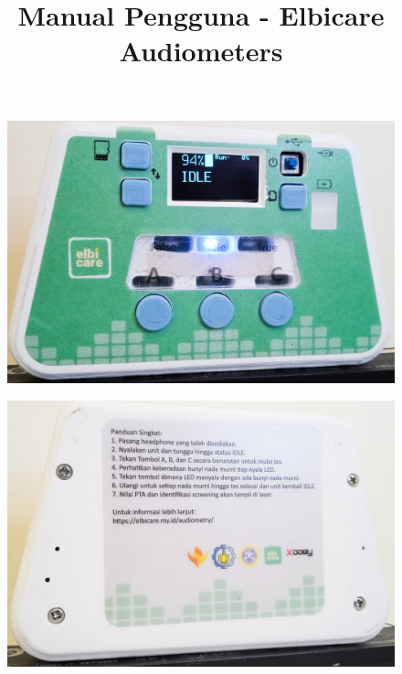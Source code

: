 \documentclass[11pt,a4paper,twoside,onecolumn]{book}
\title{Manual Pengguna - Elbicare Audiometers}
\begin{document}
	
	\maketitle
	
	\begin{figure}[H]
		\centering
		\includegraphics[width=\columnwidth]{images/depan-idle}
	\end{figure}

	\begin{figure}[H]
		\centering
		\includegraphics[width=\columnwidth]{images/belakang}
	\end{figure}
	
	\renewcommand\contentsname{Daftar Isi}
	\tableofcontents
	
	\renewcommand\listfigurename{Daftar Gambar}
	\listoffigures
	
\end{document}
